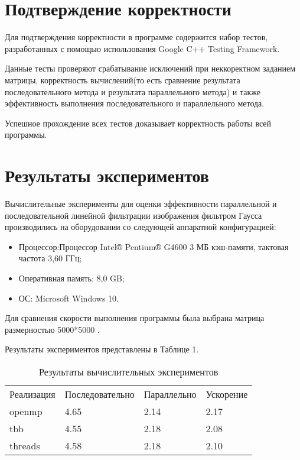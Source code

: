 \documentclass{report}
\begin{document}
\newpage

\section*{Подтверждение корректности}
Для подтверждения корректности в программе содержится набор тестов, разработанных с помощью использования Google C++ Testing Framework.
\par Данные тесты проверяют срабатывание исключений при неккоректном заданием матрицы, корректность вычислений(то есть сравнение результата последовательного метода и результата параллельного метода) и также эффективность выполнения последовательного и параллельного метода.
\par Успешное прохождение всех тестов доказывает корректность работы всей программы.
\newpage

\section*{Результаты экспериментов}
Вычислительные эксперименты для оценки эффективности параллельной и последовательной линейной фильтрации изображения фильтром Гаусса производились на оборудовании со следующей аппаратной конфигурацией:

\begin{itemize}
\item Процессор:Процессор Intel® Pentium® G4600
3 МБ кэш-памяти, тактовая частота 3,60 ГГц;
\item Оперативная память: 8,0 GB;
\item ОС: Microsoft Windows 10.
\end{itemize}

\par Для сравнения скорости выполнения программы была выбрана матрица размерностью 5000*5000 . 
\par Результаты экспериментов представлены в Таблице 1.

\begin{table}[!h]
\caption{Результаты вычислительных экспериментов}
\centering
\begin{tabular}{p{4cm} p{4cm} p{4cm} p{4cm}}
Реализация & Последовательно & Параллельно & Ускорение  \\
openmp        & 4.65          & 2.14     & 2.17       \\
tbb        & 4.55         & 2.18     & 2.08       \\
threads        & 4.58         & 2.18     & 2.10         
\end{tabular}
\end{table}
\end{document}
